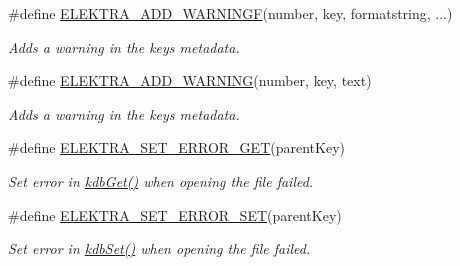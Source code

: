 \begin{DoxyCompactItemize}
\#define \mbox{\hyperlink{group__plugin_ga2bbb3bc3a3bdaf5b34b52de81886a098}{E\+L\+E\+K\+T\+R\+A\+\_\+\+A\+D\+D\+\_\+\+W\+A\+R\+N\+I\+N\+GF}}(number,  key,  formatstring, ...)
\begin{DoxyCompactList}\small\item\em Adds a warning in the keys metadata. \end{DoxyCompactList}\item 
\#define \mbox{\hyperlink{group__plugin_ga3da3bdb0f41710adda9eee3d7adac9ff}{E\+L\+E\+K\+T\+R\+A\+\_\+\+A\+D\+D\+\_\+\+W\+A\+R\+N\+I\+NG}}(number,  key,  text)
\begin{DoxyCompactList}\small\item\em Adds a warning in the keys metadata. \end{DoxyCompactList}\item 
\#define \mbox{\hyperlink{group__plugin_ga2f5d331ed725c6af0c511a0aa8677daa}{E\+L\+E\+K\+T\+R\+A\+\_\+\+S\+E\+T\+\_\+\+E\+R\+R\+O\+R\+\_\+\+G\+ET}}(parent\+Key)
\begin{DoxyCompactList}\small\item\em Set error in \mbox{\hyperlink{group__kdb_ga28e385fd9cb7ccfe0b2f1ed2f62453a1}{kdb\+Get()}} when opening the file failed. \end{DoxyCompactList}\item 
\#define \mbox{\hyperlink{group__plugin_gaf526686f01dbacd68671732aad4b5d76}{E\+L\+E\+K\+T\+R\+A\+\_\+\+S\+E\+T\+\_\+\+E\+R\+R\+O\+R\+\_\+\+S\+ET}}(parent\+Key)
\begin{DoxyCompactList}\small\item\em Set error in \mbox{\hyperlink{group__kdb_ga11436b058408f83d303ca5e996832bcf}{kdb\+Set()}} when opening the file failed. \end{DoxyCompactList}\end{DoxyCompactItemize}
